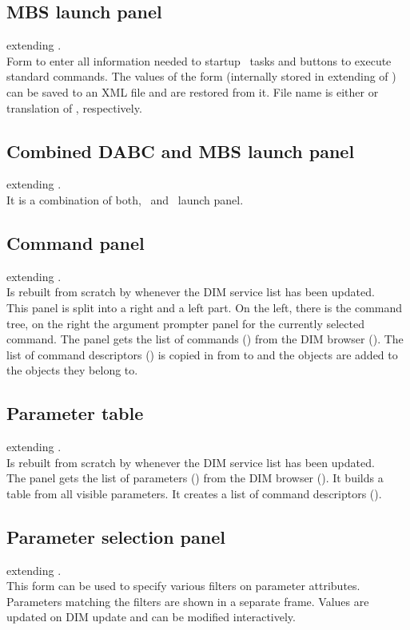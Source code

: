 \subsection{MBS launch panel}
 extending .\\
Form to enter all information needed to startup \mbs~tasks and
buttons to execute standard commands.
The values of the form (internally stored in  extending of )
can be saved to an XML file and are restored from it. File name is either
 or translation of , respectively.
\subsection{Combined DABC and MBS launch panel}
 extending .\\
It is a combination of both, \dabc~and \mbs~launch panel.
\subsection{Command panel}
 extending .\\
Is rebuilt from scratch by  whenever the DIM service list has been updated.\\
This panel is split into a right and a left part. On the left, there is the command tree,
on the right the argument prompter panel for the currently selected command.
The panel gets the list of commands () from the DIM browser ().
The list of command descriptors () is copied in  from  to
 and the  objects are added to the
 objects they belong to.
\subsection{Parameter table}
 extending .\\
Is rebuilt from scratch by  whenever the DIM service list has been updated.\\
The panel gets the list of parameters () from the DIM browser (). It builds a table from all visible parameters.
It creates a list of command descriptors ().
\subsection{Parameter selection panel}
 extending .\\
This form can be used to specify various filters on parameter attributes.
Parameters matching the filters are shown in a separate frame. Values
are updated on DIM update and can be modified interactively.

